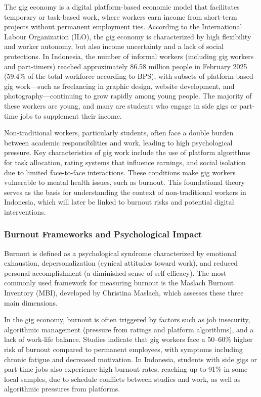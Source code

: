 The gig economy is a digital platform-based economic model that facilitates temporary or task-based work, where workers earn income from short-term projects without permanent employment ties. According to the International Labour Organization (ILO), the gig economy is characterized by high flexibility and worker autonomy, but also income uncertainty and a lack of social protections. In Indonesia, the number of informal workers (including gig workers and part-timers) reached approximately 86.58 million people in February 2025 (59.4\% of the total workforce according to BPS), with subsets of platform-based gig work—such as freelancing in graphic design, website development, and photography—continuing to grow rapidly among young people. The majority of these workers are young, and many are students who engage in side gigs or part-time jobs to supplement their income.

Non-traditional workers, particularly students, often face a double burden between academic responsibilities and work, leading to high psychological pressure. Key characteristics of gig work include the use of platform algorithms for task allocation, rating systems that influence earnings, and social isolation due to limited face-to-face interactions. These conditions make gig workers vulnerable to mental health issues, such as burnout. This foundational theory serves as the basis for understanding the context of non-traditional workers in Indonesia, which will later be linked to burnout risks and potential digital interventions.

\subsubsection{Burnout Frameworks and Psychological Impact}

Burnout is defined as a psychological syndrome characterized by emotional exhaustion, depersonalization (cynical attitudes toward work), and reduced personal accomplishment (a diminished sense of self-efficacy). The most commonly used framework for measuring burnout is the Maslach Burnout Inventory (MBI), developed by Christina Maslach, which assesses these three main dimensions.

In the gig economy, burnout is often triggered by factors such as job insecurity, algorithmic management (pressure from ratings and platform algorithms), and a lack of work-life balance. Studies indicate that gig workers face a 50--60\% higher risk of burnout compared to permanent employees, with symptoms including chronic fatigue and decreased motivation. In Indonesia, students with side gigs or part-time jobs also experience high burnout rates, reaching up to 91\% in some local samples, due to schedule conflicts between studies and work, as well as algorithmic pressures from platforms.


